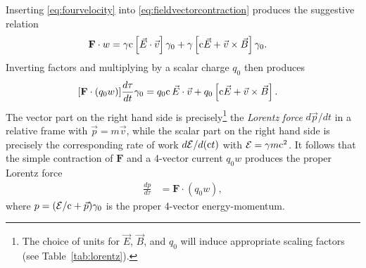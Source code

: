 \documentclass[1p,sort&compress]{elsarticle}
\numberwithin{equation}{section}
\newcommand{\rv}[1]{\vec{#1}}
\newcommand{\bv}[1]{\mathbf{#1}}
\newcommand{\cc}{{\rm c}}
\begin{document}
Inserting \eqref{eq:fourvelocity} into \eqref{eq:fieldvectorcontraction} produces the suggestive relation
\begin{align}
  \bv{F}\cdot w &= \gamma \cc\left[\rv{E}\cdot\rv{v}\right]\gamma_0 + \gamma\left[\cc\rv{E} + \rv{v}\times\rv{B}\right]\gamma_0.
\end{align}
Inverting factors and multiplying by a scalar charge $q_0$ then produces
\begin{align}\label{eq:lorentzforcerelative}
  [\bv{F}\cdot (q_0w)]\frac{d\tau}{dt}\gamma_0 &= q_0\cc\,\rv{E}\cdot\rv{v} + q_0\left[\cc\rv{E} + \rv{v}\times\rv{B}\right].
\end{align}
The vector part on the right hand side is precisely\footnote{The choice of units for $\rv{E}$, $\rv{B}$, and $q_0$ will induce appropriate scaling factors (see Table~\ref{tab:lorentz}).} the \emph{Lorentz force} $d\rv{p}/dt$ in a relative frame with $\rv{p} = m\rv{v}$, while the scalar part on the right hand side is precisely the corresponding rate of work $d\mathcal{E}/d(\cc t)$ with $\mathcal{E} = \gamma m \cc^2$. It follows that the simple contraction of $\bv{F}$ and a 4-vector current $q_0w$ produces the proper Lorentz force
\begin{align}\label{eq:lorentzforce}
  \frac{dp}{d\tau} &= \bv{F}\cdot (q_0w),
\end{align}
where $p = (\mathcal{E}/\cc + \rv{p})\gamma_0$ is the proper 4-vector energy-momentum.
\end{document}

